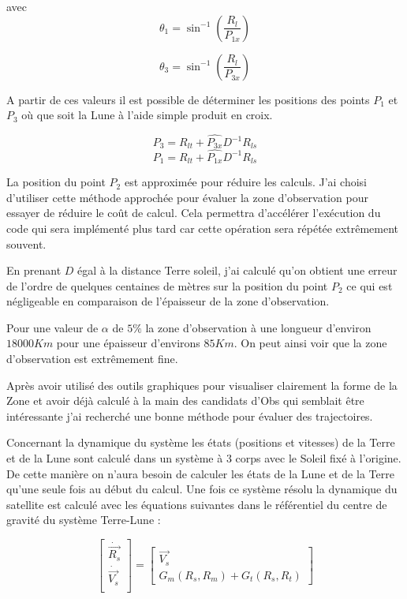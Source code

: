 \documentclass[12pt]{article} %
\begin{document}
		avec
		$$
		\theta_1=\sin^{-1}\left(\frac{R_l}{P_{1x}}\right)
		$$
		
		$$
		\theta_3=\sin^{-1}\left(\frac{R_l}{P_{3x}}\right)
		$$
		
		A partir de ces valeurs il est possible de déterminer les positions des points $P_1$ et $P_3$ où que soit la Lune à l'aide simple produit en croix.
		
		$$
		\begin{equation}
			P_3=R_{lt}+\hat{P_{3x}}D^{-1}R_{ls} 
		\end{equation}
		$$
		$$
		\begin{equation}
			P_1=R_{lt}+\hat{P_{1x}}D^{-1}R_{ls} 
		\end{equation}
		$$
		
		La position du point $P_2$ est approximée pour réduire les calculs. J'ai choisi d'utiliser cette méthode approchée pour évaluer la zone d'observation pour essayer de réduire le coût de calcul. Cela permettra d'accélérer l'exécution du code qui sera implémenté plus tard car cette opération sera répétée extrêmement souvent.
		
		En prenant $D$ égal à la distance Terre soleil, j'ai calculé qu'on obtient une erreur de l'ordre de quelques centaines de mètres sur la position du point $P_2$ ce qui est négligeable en comparaison de l'épaisseur de la zone d'observation.
		
		Pour une valeur de $\alpha$ de $5\%$ la zone d'observation à une longueur d'environ $18000 Km$ pour une épaisseur d'environs $85 Km$. On peut ainsi voir que la zone d'observation est extrêmement fine.
		
		Après avoir utilisé des outils graphiques pour visualiser clairement la forme de la \gls{Zone} et avoir déjà calculé à la main des candidats d'\gls{Obs} qui semblait être intéressante j'ai recherché une bonne méthode pour évaluer des trajectoires.
		
		Concernant la dynamique du système les états (positions et vitesses) de la Terre et de la Lune sont calculé dans un système à 3 corps avec le Soleil fixé à l'origine. De cette manière on n'aura besoin de calculer les états de la Lune et de la Terre qu'une seule fois au début du calcul. Une fois ce système résolu la dynamique du satellite est calculé avec les équations suivantes dans le référentiel du centre de gravité du système Terre-Lune :
		
		$$
		\begin{bmatrix}
			\dot{\overrightarrow{R_{s}}}\\
			\dot{\overrightarrow{V_{s}}}\\
		\end{bmatrix} =\begin{bmatrix}
			\overrightarrow{V_{s}}\\
			G_{m}(R_s,R_m)+G_{t}(R_s,R_t)
		\end{bmatrix}
		$$
		
\end{document}
